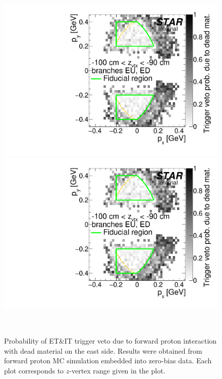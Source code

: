 \begin{figure}[hb]
\caption[Probability of ET\&IT trigger veto due to forward proton interaction with dead material on the east.]{Probability of ET\&IT trigger veto due to forward proton interaction with dead material on the east side. Results were obtained from forward proton MC simulation embedded into zero-bias data. Each plot corresponds to $z$-vertex range given in the plot.}\label{fig:rpDeadMatProbE} 
\centering
\parbox{0.495\textwidth}{
  \centering
  \includegraphics[width=\linewidth,page=3]{graphics/corrections/mcDeadMatProbPxPy.pdf}\\
  \includegraphics[width=\linewidth,page=5]{graphics/corrections/mcDeadMatProbPxPy.pdf}
}~
\parbox{0.495\textwidth}{
  \centering
}
\end{figure}
